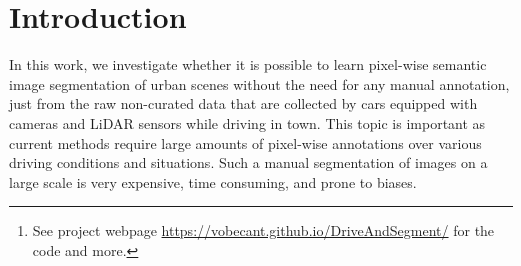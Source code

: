 \documentclass[runningheads]{llncs}
\begin{document}


\maketitle

\begin{abstract}
This work investigates learning pixel-wise semantic image segmentation in urban scenes without any manual annotation, just from the raw non-curated data collected by cars which, equipped with cameras and LiDAR sensors, drive around a city. Our contributions are threefold. First, we propose a novel method for cross-modal unsupervised learning of semantic image segmentation by leveraging synchronized LiDAR and image data. The key ingredient of our method is the use of an object proposal module that analyzes the LiDAR point cloud to obtain proposals for spatially consistent objects. Second, we show that these 3D object proposals can be aligned with the input images and reliably clustered into semantically meaningful pseudo-classes. Finally, we develop a cross-modal distillation approach that leverages image data partially annotated with the resulting pseudo-classes to train a transformer-based model for image semantic segmentation. 
We show the generalization capabilities of our method by testing on four different testing datasets (Cityscapes, Dark Zurich, Nighttime Driving and ACDC) without any finetuning, and demonstrate significant improvements compared to the current state of the art on this problem.
\footnote{See project webpage \href{https://vobecant.github.io/DriveAndSegment/}{https://vobecant.github.io/DriveAndSegment/} for the code and more.}
\end{abstract}


\section{Introduction}
\label{sec:intro}

In this work, we investigate whether it is possible to learn pixel-wise semantic image segmentation of urban scenes without the need for any manual annotation, just from the raw non-curated data that are collected by cars equipped with cameras and LiDAR sensors while driving in town. 
This topic is important as current methods require large amounts of pixel-wise annotations over various driving conditions and situations. Such a manual segmentation of images on a large scale is very expensive, time consuming, and prone to biases.
\end{document}
